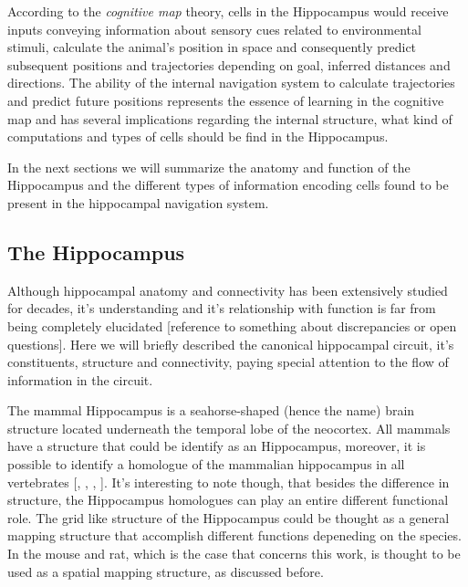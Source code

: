 According to the \textit{cognitive map} theory, cells in the Hippocampus would receive inputs conveying information about sensory cues related to environmental stimuli, calculate the animal's position in space and consequently predict subsequent positions and trajectories depending on goal, inferred distances and directions. 
The ability of the internal navigation system to calculate trajectories and predict future positions represents the essence of learning in the cognitive map and has several implications regarding the internal structure, what kind of computations and types of cells should be find in the Hippocampus.

In the next sections we will summarize the anatomy and function of the Hippocampus and the different types of information encoding cells found to be present in the hippocampal navigation system.

\subsection{The Hippocampus}
\label{chap1:sec:1:subsec1:hippocampus}
Although hippocampal anatomy and connectivity has been extensively studied for decades, it's understanding and it's relationship with function is far from being completely elucidated [reference to something about discrepancies or open questions]. 
Here we will briefly described the canonical hippocampal circuit, it's constituents, structure and connectivity, paying special attention to the flow of information in the circuit.

The mammal Hippocampus is a seahorse-shaped (hence the name) brain structure located underneath the temporal lobe of the neocortex.
All mammals have a structure that could be identify as an Hippocampus, moreover, it is possible to identify a homologue of the mammalian hippocampus in all vertebrates [\cite{okeefebook}, \cite{kappersandcrosby}, \cite{heier1948}, \cite{crosby1966}].
It's interesting to note though, that besides the difference in structure, the Hippocampus homologues can play an entire different functional role.
The grid like structure of the Hippocampus could be thought as a general mapping structure that accomplish different functions depeneding on the species. 
In the mouse and rat, which is the case that concerns this work, is thought to be used as a spatial mapping structure, as discussed before.

